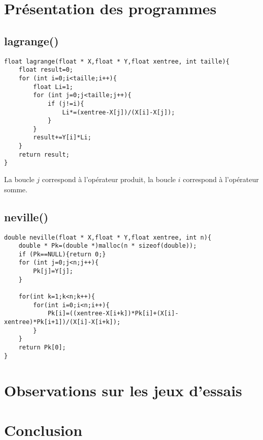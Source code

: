 \documentclass[10pt,a4paper,french]{article}
\begin{document}
\section{Présentation des programmes}
\subsection{lagrange()}
\begin{lstlisting}
float lagrange(float * X,float * Y,float xentree, int taille){
    float result=0;
    for (int i=0;i<taille;i++){ 
        float Li=1;
        for (int j=0;j<taille;j++){
            if (j!=i){
                Li*=(xentree-X[j])/(X[i]-X[j]);
            }
        }  
        result+=Y[i]*Li;
    }
    return result;
}
\end{lstlisting}
La boucle $j$ correspond à l'opérateur produit, la boucle $i$ correspond à l'opérateur somme.
\subsection{neville()}
\begin{lstlisting}
double neville(float * X,float * Y,float xentree, int n){
    double * Pk=(double *)malloc(n * sizeof(double));
    if (Pk==NULL){return 0;}
    for (int j=0;j<n;j++){
        Pk[j]=Y[j];
    }

    for(int k=1;k<n;k++){
        for(int i=0;i<n;i++){
            Pk[i]=((xentree-X[i+k])*Pk[i]+(X[i]-xentree)*Pk[i+1])/(X[i]-X[i+k]);
        }
    }
    return Pk[0];
}

\end{lstlisting}
\section{Observations sur les jeux d'essais}
\section{Conclusion}
\end{document}
